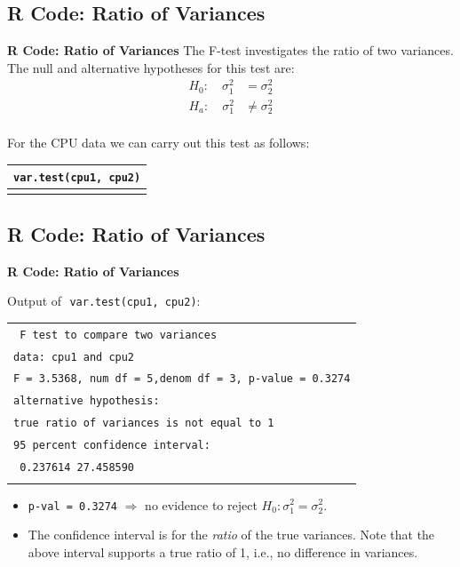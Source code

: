 \documentclass[compress]{beamer}        %
\makeatletter
\newcommand{\tcb}{\textcolor{beamer@blendedblue}}
\makeatother
\begin{document}
\subsection{R Code: Ratio of Variances}
\begin{frame}{\bf \tcb{R Code: Ratio of Variances}}
The F-test investigates the ratio of two variances. The null and alternative hypotheses for this test are:\\[-0.2cm]
\begin{align*}
H_0: \quad \sigma^2_1 &= \sigma^2_2 \\[0.2cm]
H_a: \quad \sigma^2_1 &\ne \sigma^2_2\\[-0.3cm]
\end{align*}

For the CPU data we can carry out this test as follows:\\[0.3cm]
\begin{tabular}{|l|}
\hline
\texttt{var.test(cpu1, cpu2)}\\[0.2cm]
\hline
\multicolumn{1}{c}{}\\[-0.2cm]
\end{tabular}

\end{frame}




\subsection{R Code: Ratio of Variances}
\begin{frame}{\bf \tcb{R Code: Ratio of Variances}}

Output of\,\, \texttt{var.test(cpu1, cpu2)}:\\[-0.2cm]
\begin{adjustwidth}{-0.3cm}{0cm}
\begin{tabular}{|l|}
\hline
\texttt{ F test to compare two variances}\\[0.2cm]
\texttt{data:  cpu1 and cpu2}\\
\texttt{F = 3.5368, num df = 5,denom df = 3, p-value = 0.3274}\\
\texttt{alternative hypothesis:}\\
\texttt{true ratio of variances is not equal to 1}\\[0.2cm]
\texttt{95 percent confidence interval:}\\
\texttt{  0.237614 27.458590}\\
\hline
\multicolumn{1}{c}{}\\[0.0cm]
\end{tabular}
\end{adjustwidth}
\begin{itemize}\itemsep0.3cm
\item \texttt{p-val = 0.3274} $\Rightarrow$ no evidence to reject $H_0:  \sigma_1^2 = \sigma_2^2$.
\item The confidence interval is for the \emph{ratio} of the true variances. Note that the above interval supports a true ratio of 1, i.e., no difference in variances.
\end{itemize}

\end{frame}
\end{document}
